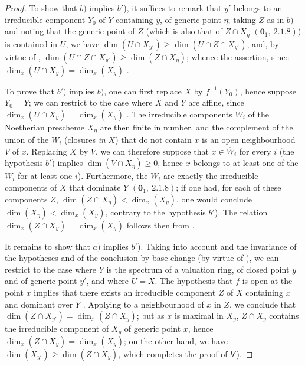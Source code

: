 \begin{proof}
To show that $b)$ implies $b'$), it suffices to remark that $y'$ belongs to an irreducible component $Y_0$ of $Y$ containing $y$, of generic point $\eta$; taking $Z$ as in $b)$ and noting that the generic point of $Z$ (which is also that of $Z\cap X_\eta$ $(\mathbf{0}_1,~2.1.8)$) is contained in $U$, we have $\dim(U\cap X_{y'})\geq\dim(U\cap Z\cap X_{y'})$, and, by virtue of , $\dim(U\cap Z\cap X_{y'})\geq\dim(Z\cap X_\eta)$; whence the assertion, since $\dim_x(U\cap X_y)=\dim_x(X_y)$ .

To prove that $b')$ implies $b)$, one can first replace $X$ by $f^{-1}(Y_0)$, hence suppose $Y_0=Y$; we can restrict to the case where $X$ and $Y$ are affine, since $\dim_x(U\cap X_y)=\dim_x(X_y)$ .
The irreducible components $W_i$ of the Noetherian prescheme $X_\eta$ are then finite in number, and the complement of the union of the $\overline{W}_i$ (closures \emph{in} $X$) that do not contain $x$ is an open neighbourhood $V$ of $x$.
Replacing $X$ by $V$, we can therefore suppose that $x\in\overline{W}_i$ for every $i$ (the hypothesis $b'$) implies $\dim(V\cap X_\eta)\geq 0$, hence $x$ belongs to at least one of the $\overline{W}_i$ for at least one $i$).
Furthermore, the $\overline{W}_i$ are exactly the irreducible components of $X$ that dominate $Y$ $(\mathbf{0}_1,~2.1.8)$; if one had, for each of these components $Z$, $\dim(Z\cap X_\eta)<\dim_x(X_y)$, one would conclude $\dim(X_\eta)<\dim_x(X_y)$, contrary to the hypothesis $b'$).
The relation $\dim_x(Z\cap X_y)=\dim_x(X_y)$ follows then from .

It remains to show that $a)$ implies $b'$).
Taking into account  and the invariance of the hypotheses and of the conclusion by base change (by virtue of ), we can restrict to the case where $Y$ is the spectrum of a valuation ring, of closed point $y$ and of generic point $y'$, and where $U=X$.
The hypothesis that $f$ is open at the point $x$ implies that there exists an irreducible component $Z$ of $X$ containing $x$ and dominant over $Y$ .
Applying  to a neighbourhood of $x$ in $Z$, we conclude that $\dim(Z\cap X_{y'})=\dim_x(Z\cap X_y)$; but as $x$ is maximal in $X_y$, $Z\cap X_y$ contains the irreducible component of $X_y$ of generic point $x$, hence $\dim_x(Z\cap X_y)=\dim_x(X_y)$; on the other hand, we have $\dim(X_{y'})\geq\dim(Z\cap X_y)$, which completes the proof of $b'$).
\end{proof}

